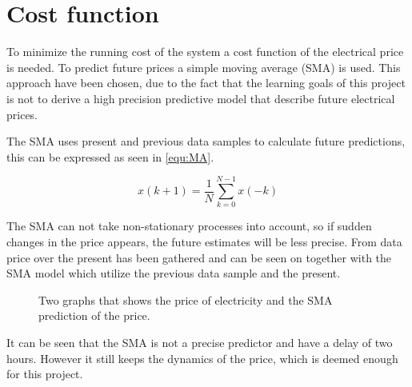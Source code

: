 \section{Cost function}

To minimize the running cost of the system a cost function of the electrical price is needed. To predict future prices a simple moving average (SMA) is used.
This approach have been chosen, due to the fact that the learning goals of this project is not to derive a high precision predictive model that describe future electrical prices.

The SMA uses present and previous data samples to calculate future predictions, this can be expressed as seen in \eqref{equ:MA}.

\begin{equation}
x(k+1) = \frac{1}{N}\sum\limits_{k=0}^{N-1} x(-k)
\label{equ:MA}
\end{equation} 

The SMA can not take non-stationary processes into account, so if sudden changes in the price appears, the future estimates will be less precise. From \cite{Electrical_price} data price over the present has been gathered and can be seen on  together with the SMA model which utilize the previous data sample and the present. 

\begin{figure}[H]
\centering

\caption{Two graphs that shows the price of electricity and the SMA prediction of the price.}
\label{fig:electrical_price} 
\end{figure}

It can be seen that the SMA is not a precise predictor and have a delay of two hours. However it still keeps the dynamics of the price, which is deemed enough for this project.
